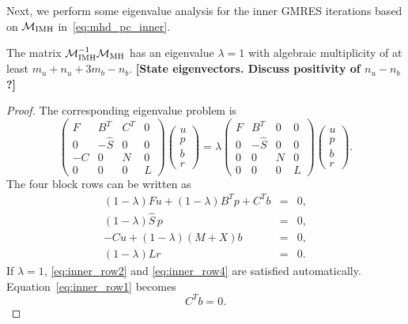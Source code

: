 \documentclass{siamltex}
\begin{document}
Next, we perform some eigenvalue analysis for the inner GMRES iterations based
on $\mathcal{M}_{\rm IMH}$ in~\eqref{eq:mhd_pc_inner}.

\begin{theorem}
\label{thm:mhd_inner}
The matrix $\mathcal{M}_{\rm IMH}^{-1} \mathcal{M}_{\rm MH} $ has an eigenvalue $\lambda = 1$ with algebraic multiplicity of at least $m_u + n_u + 3m_b - n_b$.
 {\bf [State eigenvectors. Discuss positivity of $n_u-n_b$?]}
\end{theorem}

\begin{proof}
The corresponding eigenvalue problem is
\begin{equation*}
\left(
\begin{array}{cccc}
F & B^T & C^T & 0\\
0 & -\widehat{S} & 0& 0\\
-C & 0& N & 0\\
0 & 0 & 0 & L
\end{array}
\right)
\left(
\begin{array}{c}
u\\
p\\
b\\
r
\end{array}
\right)
=
\lambda \left(
\begin{array}{cccc}
F & B^T &0 & 0\\
0 & -\widehat{S} & 0 & 0\\
0 &0 & N & 0\\
0 & 0 &  0 & L
\end{array}
\right)
\left(
\begin{array}{c}
u\\
p\\
b\\
r
\end{array}
\right).
\end{equation*}
The four block rows can be written as
\begin{eqnarray}
\label{eq:inner_row1} (1-\lambda)Fu +(1-\lambda)B^T p+ C^T b &=& 0,\\
\label{eq:inner_row2} (1-\lambda) \widehat{S} \,p &=& 0,\\
\label{eq:inner_row3} -C u + (1 - \lambda) (M+X) b  &=& 0,\\
\label{eq:inner_row4} (1-\lambda)L r &=& 0.
\end{eqnarray}
If $\lambda = 1$, \eqref{eq:inner_row2} and \eqref{eq:inner_row4} are satisfied automatically.
Equation~\eqref{eq:inner_row1} becomes
$$C^T b = 0.$$

\end{proof}
\end{document}
